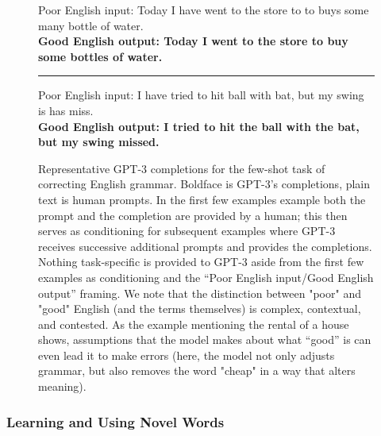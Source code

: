 \documentclass{article}
\begin{document}
\begin{figure}
{{{{\color{gray}Poor English input: Today I have went to the store to to buys some many bottle of water.\\}\textbf{Good English output: Today I went to the store to buy some bottles of water.}\\ \rule{\linewidth}{0.8pt}\vspace{0.5em}
{\color{gray}Poor English input: I have tried to hit ball with bat, but my swing is has miss.\\}\textbf{Good English output: I tried to hit the ball with the bat, but my swing missed.}}
}}
\caption{Representative GPT-3 completions for the few-shot task of correcting English grammar.  Boldface is GPT-3’s completions, plain text is human prompts.  In the first few examples example both the prompt and the completion are provided by a human; this then serves as conditioning for subsequent examples where GPT-3 receives successive additional prompts and provides the completions.  Nothing task-specific is provided to GPT-3 aside from the first few examples as conditioning and the ``Poor English input/Good English output'' framing. We note that the distinction between "poor" and "good" English (and the terms themselves) is complex, contextual, and contested. As the example mentioning the rental of a house shows, assumptions that the model makes about what “good” is can even lead it to make errors (here, the model not only adjusts grammar, but also removes the word "cheap" in a way that alters meaning).}
\label{completion:grammar}

\end{figure}         \subsubsection{Learning and Using Novel Words}
        \label{section:Learning_and_Using_Novel_Words}
\end{document}
